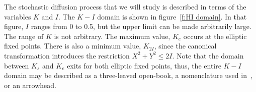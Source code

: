 
The stochastic diffusion process that we will study is described in terms of the variables $K$ and $I$. The $K-I$ domain is shown in figure~\ref{f:HI domain}. In that figure, $I$ ranges from 0 to 0.5, but the upper limit can be made arbitrarily large. The range of $K$ is not arbitrary. The maximum value, $K_e$ occurs at the elliptic fixed points. There is also a minimum value, $K_{2I}$, since the canonical transformation introduces the restriction $X^2 + Y^2 \leq 2 I$. Note that the domain between $K_s$ and $K_e$ exits for both elliptic fixed points, thus, the entire $K-I$ domain may be described as a three-leaved open-book, a nomenclature used in~\citet{freidlin04:_diffus}, or an arrowhead.





